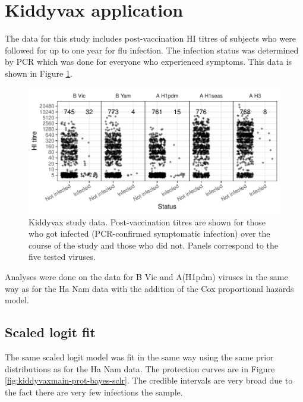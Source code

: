 \documentclass[12pt]{article}
\begin{document}
\pagebreak
\section{Kiddyvax application}

The data for this study includes post-vaccination HI titres of subjects who were followed for up to one year for flu infection. The infection status was determined by PCR which was done for everyone who experienced symptoms. This data is shown in Figure \ref{fig:kiddyvax-main-titre}.

\begin{figure}[htp]
	\centering
	\includegraphics[width=1\textwidth]{../data-plot/kiddyvax-main-titre.pdf}
	\caption{
	Kiddyvax study data. Post-vaccination titres are shown for those who got infected (PCR-confirmed symptomatic infection) over the course of the study and those who did not. Panels correspond to the five tested viruses.
	}
	\label{fig:kiddyvax-main-titre}
\end{figure}

Analyses were done on the data for B Vic and A(H1pdm) viruses in the same way as for the Ha Nam data with the addition of the Cox proportional hazards model.

%
\subsection{Scaled logit fit}

The same scaled logit model was fit in the same way using the same prior distributions as for the Ha Nam data. The protection curves are in Figure \ref{fig:kiddyvaxmain-prot-bayes-sclr}. The credible intervals are very broad due to the fact there are very few infections the sample.
\end{document}
